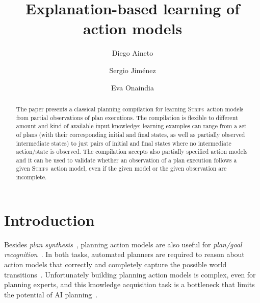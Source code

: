\documentclass[runningheads]{llncs}
\newcommand{\strips}{\textsc{Strips}}     %
\begin{document}
%
\title{Explanation-based learning of action models}
%
%
\author{Diego Aineto \and
Sergio Jim\'enez \and
Eva Onaindia}
%
%
%
\maketitle              %
%
\begin{abstract}
The paper presents a classical planning compilation for learning \strips\ action models from partial observations of plan executions. The compilation is flexible to different amount and kind of available input knowledge; learning examples can range from a set of plans (with their corresponding initial and final states, as well as partially observed intermediate states) to just pairs of initial and final states where no intermediate action/state is observed. The compilation accepts also partially specified action models and it can be used to validate whether an observation of a plan execution follows a given \strips\ action model, even if the given model or the given observation are incomplete.
\end{abstract}



\section{Introduction}
Besides {\em plan synthesis}~\cite{ghallab2004automated}, planning action models are also useful for {\em plan/goal recognition}~\cite{ramirez2012plan}. In both tasks, automated planners are required to reason about action models that correctly and completely capture the possible world transitions~\cite{geffner:book:2013}. Unfortunately building planning action models is complex, even for planning experts, and this knowledge acquisition task is a bottleneck that limits the potential of AI planning~\cite{kambhampati:modellite:AAAI2007}.
\end{document}
